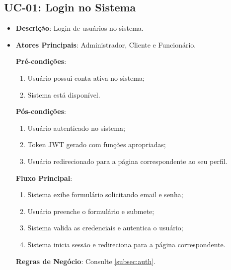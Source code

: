 \subsection{UC-01: Login no Sistema}

\begin{itemize}[topsep=1pt, itemsep=0pt]
  \item[]\textbf{Descrição}: Login de usuários no sistema.

  \item[]\textbf{Atores Principais}: Administrador, Cliente e Funcionário.

  \textbf{Pré-condições}:
  \begin{enumerate}
    \item Usuário possui conta ativa no sistema;
    \item Sistema está disponível.
  \end{enumerate}

  \textbf{Pós-condições}:
  \begin{enumerate}
    \item Usuário autenticado no sistema;
    \item Token JWT gerado com funções apropriadas;
    \item Usuário redirecionado para a página correspondente ao seu perfil.
  \end{enumerate}

  \textbf{Fluxo Principal}:
  \begin{enumerate}
    \item Sistema exibe formulário solicitando email e senha;
    \item Usuário preenche o formulário e submete;
    \item Sistema valida as credenciais e autentica o usuário;
    \item Sistema inicia sessão e redireciona para a página correspondente.
  \end{enumerate}

  \textbf{Regras de Negócio}: Consulte \ref{subsec:auth}.
 \end{itemize}
